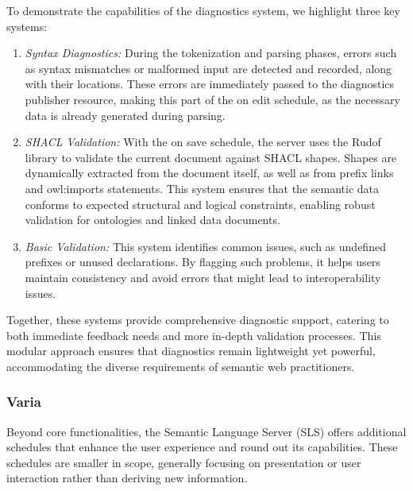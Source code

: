 To demonstrate the capabilities of the diagnostics system, we highlight three key systems:

\begin{enumerate}
  \item \textit{Syntax Diagnostics:}
    During the tokenization and parsing phases, errors such as syntax mismatches or malformed input are detected and recorded, along with their locations.
    These errors are immediately passed to the diagnostics publisher resource, making this part of the on edit schedule, as the necessary data is already generated during parsing.
  \item \textit{SHACL Validation:} 
    With the on save schedule, the server uses the Rudof library to validate the current document against SHACL shapes.
    Shapes are dynamically extracted from the document itself, as well as from prefix links and owl:imports statements.
    This system ensures that the semantic data conforms to expected structural and logical constraints, enabling robust validation for ontologies and linked data documents.
  \item \textit{Basic Validation:}
    This system identifies common issues, such as undefined prefixes or unused declarations.
    By flagging such problems, it helps users maintain consistency and avoid errors that might lead to interoperability issues.
\end{enumerate}

Together, these systems provide comprehensive diagnostic support, catering to both immediate feedback needs and more in-depth validation processes.
This modular approach ensures that diagnostics remain lightweight yet powerful, accommodating the diverse requirements of semantic web practitioners.

\subsubsection{Varia}

Beyond core functionalities, the Semantic Language Server (SLS) offers additional schedules that enhance the user experience and round out its capabilities.
These schedules are smaller in scope, generally focusing on presentation or user interaction rather than deriving new information.

